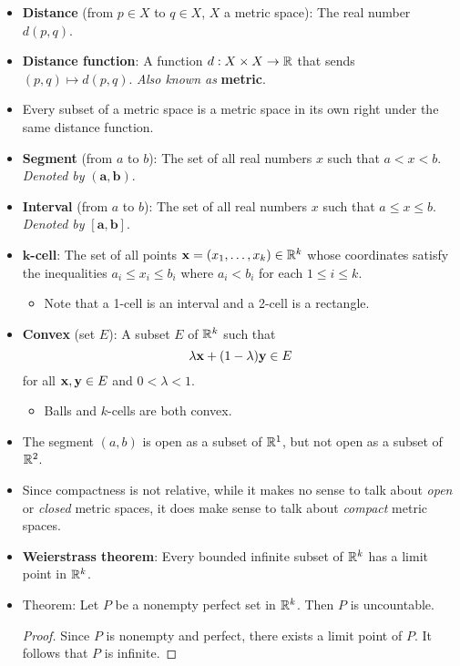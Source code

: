 \documentclass[../../notes.tex]{subfiles}
\begin{document}
\begin{itemize}
\begin{enumerate}
    \end{enumerate}
    \item \textbf{Distance} (from $p\in X$ to $q\in X$, $X$ a metric space): The real number $d(p,q)$.
    \item \textbf{Distance function}: A function $d:X\times X\to\mathbb{R}$ that sends $(p,q)\mapsto d(p,q)$. \emph{Also known as} \textbf{metric}.
    \item Every subset of a metric space is a metric space in its own right under the same distance function.
    \item \textbf{Segment} (from $a$ to $b$): The set of all real numbers $x$ such that $a<x<b$. \emph{Denoted by} $\bm{(a,b)}$.
    \item \textbf{Interval} (from $a$ to $b$): The set of all real numbers $x$ such that $a\leq x\leq b$. \emph{Denoted by} $\bm{[a,b]}$.
    \item \textbf{$\bm{k}$-cell}: The set of all points $\mathbf{x}=(x_1,\dots,x_k)\in\mathbb{R}^k$ whose coordinates satisfy the inequalities $a_i\leq x_i\leq b_i$ where $a_i<b_i$ for each $1\leq i\leq k$.
    \begin{itemize}
        \item Note that a 1-cell is an interval and a 2-cell is a rectangle.
    \end{itemize}
    \item \textbf{Convex} (set $E$): A subset $E$ of $\mathbb{R}^k$ such that
    \begin{equation*}
        \lambda\mathbf{x}+(1-\lambda)\mathbf{y} \in E
    \end{equation*}
    for all $\mathbf{x},\mathbf{y}\in E$ and $0<\lambda<1$.
    \begin{itemize}
        \item Balls and $k$-cells are both convex.
    \end{itemize}
    \item The segment $(a,b)$ is open as a subset of $\mathbb{R}^1$, but not open as a subset of $\mathbb{R}^2$.
    \item Since compactness is not relative, while it makes no sense to talk about \emph{open} or \emph{closed} metric spaces, it does make sense to talk about \emph{compact} metric spaces.
    \item \textbf{Weierstrass theorem}: Every bounded infinite subset of $\mathbb{R}^k$ has a limit point in $\mathbb{R}^k$.
    \item Theorem: Let $P$ be a nonempty perfect set in $\mathbb{R}^k$. Then $P$ is uncountable.
    \begin{proof}
        Since $P$ is nonempty and perfect, there exists a limit point of $P$. It follows that $P$ is infinite.\par

\end{proof}
\end{itemize}
\end{document}
